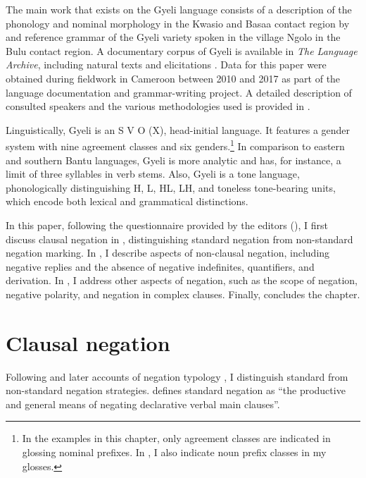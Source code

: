 \documentclass[output=paper,colorlinks=true, citecolor=brown,draftmode]{langscibook}
\begin{document}
The main work that exists on the Gyeli language consists of a description of the phonology and nominal morphology in the Kwasio and Basaa contact region by \citet{Renaud76} and  reference grammar of the Gyeli variety spoken in the village Ngolo in the Bulu contact region. A documentary corpus of Gyeli is available in {\itshape The Language Archive}, including natural texts and elicitations \citep{Grimm2020}.  Data for this paper were obtained during fieldwork in Cameroon between 2010 and 2017 as part of the language documentation and grammar-writing project. A detailed description of consulted speakers and the various methodologies used is provided in \citet[28--29]{Grimm2021}.

Linguistically, Gyeli is an S V O (X), head-initial language. It features a gender system with nine agreement classes and six genders.\footnote{In the examples in this chapter, only agreement classes are indicated in glossing nominal prefixes. In \citet{Grimm2021}, I also indicate noun prefix classes in my glosses.}
In comparison to eastern and southern Bantu languages, Gyeli is more analytic and has, for instance, a limit of three syllables in verb stems. Also, Gyeli is a tone language, phonologically distinguishing H, L, HL, LH, and toneless tone-bearing units, which encode both lexical and grammatical distinctions. 

In this paper, following the questionnaire provided by the editors (),
I first discuss clausal negation in , distinguishing standard negation from non-standard negation marking. In , I describe aspects of non-clausal negation, including negative replies and the absence of negative indefinites, quantifiers, and derivation. In , I address other aspects of negation, such as the scope of negation, negative polarity, and negation in complex clauses. Finally,  concludes the chapter.

\section{Clausal negation}
\label{sec:gye:ClausNEG}

Following \citet[42]{Miestamo2005} and later accounts of negation typology \citep{AuweraKrasnoukhova2020}, I distinguish standard from non-standard negation strategies.  \citet[42]{Miestamo2005} defines standard  negation  as ``the productive and general means of negating declarative verbal main clauses''. 
\end{document}
